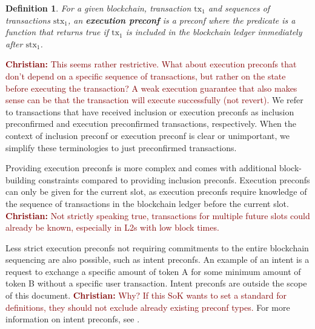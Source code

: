 \documentclass[a4paper]{article}
\theoremstyle{boldstyle}
\newtheorem{definitionx}{Definition}
\newenvironment{definition}
  {\begin{defopenboxq}\begin{definitionx}}
  {\end{definitionx}\end{defopenboxq}}
\newcommand{\cm}[1]{\textcolor{blue}{\textbf{Conor:} #1}}
\newcommand{\chm}[1]{\textcolor{Maroon}{\textbf{Christian:} #1}}
\begin{document}
        \begin{definition}
        For a given blockchain, transaction $\mathrm{tx_1}$ and sequences of transactions $\mathrm{stx}_1$, an \textbf{execution preconf} is a preconf where the predicate is a function that returns true if $\mathrm{tx_1}$ is included in the blockchain ledger immediately after $\mathrm{stx}_1$.
        \end{definition}
        \chm{This seems rather restrictive. What about execution preconfs that don't depend on a specific sequence of transactions, but rather on the state before executing the transaction? A weak execution guarantee that also makes sense can be that the transaction will execute successfully (not revert).}
        We refer to transactions that have received inclusion or execution preconfs as inclusion preconfirmed and execution preconfirmed transactions, respectively. When the context of inclusion preconf or execution preconf is clear or unimportant, we simplify these terminologies to just preconfirmed transactions.
        
        Providing execution preconfs is more complex and comes with additional block-building constraints compared to providing inclusion preconfs. Execution preconfs can only be given for the current slot, as execution preconfs require knowledge of the sequence of transactions in the blockchain ledger before the current slot. \chm{Not strictly speaking true, transactions for multiple future slots could already be known, especially in L2s with low block times.}
        
        Less strict execution preconfs not requiring commitments to the entire blockchain sequencing are also possible, such as intent preconfs. An example of an intent is a request to exchange a specific amount of token A for some minimum amount of token B without a specific user transaction. Intent preconfs are outside the scope of this document. \chm{Why? If this SoK wants to set a standard for definitions, they should not exclude already existing preconf types.} For more information on intent preconfs, see \cite{W:Intent-BasedArchitectureandTheirRisks, ERC-7521}.
\end{document}
